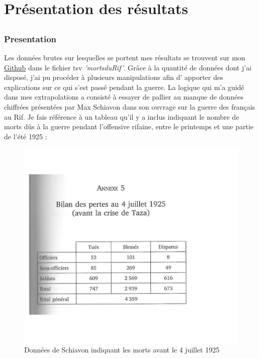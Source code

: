 \part{Présentation des résultats}
\chapter{}
\section{Presentation}
Les données brutes sur lesquelles se portent  mes résultats se trouvent sur mon  \href{https://github.com/the0phil3/projetMemoire/}{Github} dans le fichier tsv \emph{'mortsduRif'}. Grâce à la quantité de données dont j’ai disposé, j’ai pu procéder à plusieurs manipulations afin d' apporter des explications sur ce qui s’est passé pendant la guerre. La logique qui m’a guidé dans  mes extrapolations a consisté à essayer de pallier au manque de données chiffrées présentées par Max Schiavon dans son ouvrage sur la guerre des français au Rif. Je fais référence à un tableau qu’il y a inclus  indiquant le nombre de morts dûs à  la guerre pendant l’offensive rifaine, entre le printemps et une partie de l’été 1925 : 
\begin{figure}[H]
    \centering
    \includegraphics[scale=0.36]{Images/schiavon.jpeg}
    \caption[Note d'image]{Données de Schiavon indiquant les morts avant le 4 juillet 1925\footnotemark}
    \label{fig:Morts Schiavon }
\end{figure} 
